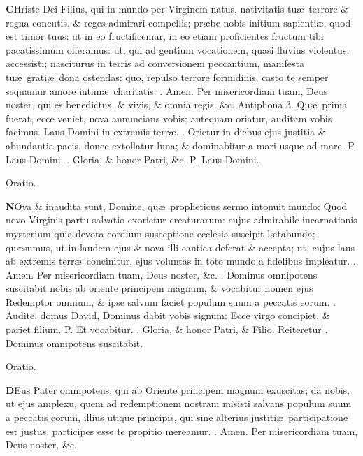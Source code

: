 \documentclass[letter,11pt]{book}
\makeatletter
\DeclareRobustCommand{\Vbar}{\vers@resp{-0.1em}{V}}
\DeclareRobustCommand{\Rbar}{\vers@resp{0pt}{R}}
\newcommand{\vers@resp@sym}{\raisebox{0.2ex}{\rotatebox[origin=c]{-20}{$\m@th\rceil$}}}
\newcommand{\vers@resp}[2]{%
  {\ooalign{\hidewidth\kern#1\vers@resp@sym\hidewidth\cr#2\cr}}%
}%
\def\P{\color{Red} P. \color{black}}
\def\V{\color{Red} \Vbar . \color{black}}
\def\R{\color{Red} \Rbar . \color{black}}
\makeatother
\begin{document}
\begin{multicols}{2}
\lettrine[lines=2]{\bfseries \color{Red} C}{}Hriste Dei Filius, qui in mundo per Virginem natus, nativitatis tu\ae \ terrore \& regna concutis, \& reges admirari compellis; pr\ae be nobis initium sapienti\ae , quod est timor tuus: ut in eo fructificemur, in eo etiam proficientes fructum tibi pacatissimum offeramus: ut, qui ad gentium vocationem, quasi fluvius violentus, accessisti; nasciturus in terris ad conversionem peccantium, manifesta tu\ae \ grati\ae \ dona ostendas: quo, repulso terrore formidinis, casto te semper sequamur amore intim\ae \ charitatis. \R Amen. Per misericordiam tuam, Deus noster, qui es benedictus, \& vivis, \& omnia regis, \&c.
\newline \color{Red} Antiphona 3. \color{black} Qu\ae \ prima fuerat, ecce veniet, nova annuncians vobis; antequam oriatur, auditam vobis facimus. Laus Domini in extremis terr\ae . \V Orietur in diebus ejus justitia \& abundantia pacis, donec extollatur luna; \& dominabitur a mari usque ad mare. \P Laus Domini. \V Gloria, \& honor Patri, \&c. \P Laus Domini.
\vspace{-.5em} \begin{center} \color{Red} Oratio. \color{black} \end{center} \vspace{-.5em}
\lettrine[lines=2]{\bfseries \color{Red} N}{}Ova \& inaudita sunt, Domine, qu\ae \ propheticus sermo intonuit mundo: Quod novo Virginis partu salvatio exorietur creaturarum: cujus admirabile incarnationis mysterium quia devota cordium susceptione ecclesia suscipit l\ae tabunda; qu\ae sumus, ut in laudem ejus \& nova illi cantica deferat \& accepta; ut, cujus laus ab extremis terr\ae \ concinitur, ejus voluntas in toto mundo a fidelibus impleatur. \R Amen. Per misericordiam tuam, Deus noster, \&c. \R Dominus omnipotens suscitabit nobis ab oriente principem magnum, \& vocabitur nomen ejus Redemptor omnium, \& ipse salvum faciet populum suum a peccatis eorum. \V Audite, domus David, Dominus dabit vobis signum: Ecce virgo concipiet, \& pariet filium. \P Et vocabitur. \V Gloria, \& honor Patri, \& Filio. \color{Red} Reiteretur \color{black} \R Dominus omnipotens suscitabit.
\vspace{-.5em} \begin{center} \color{Red} Oratio. \color{black} \end{center} \vspace{-.5em}
\lettrine[lines=2]{\bfseries \color{Red} D}{}Eus Pater omnipotens, qui ab Oriente principem magnum exuscitas; da nobis, ut ejus amplexu, quem ad redemptionem nostram misisti salvans populum suum a peccatis eorum, illius utique principis, qui sine alterius justiti\ae \ participatione est justus, participes esse te propitio mereamur. \R Amen. Per misericordiam tuam, Deus noster, \&c.

\end{multicols}
\end{document}
